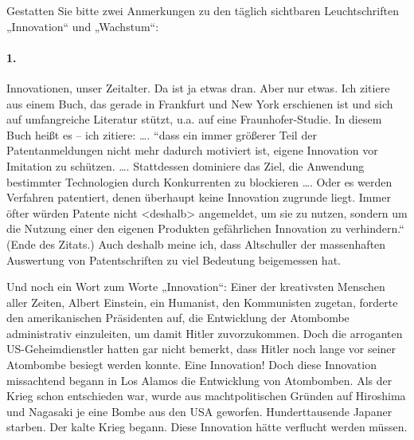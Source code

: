 \documentclass[12pt,a4paper]{article}
\begin{document}
Gestatten Sie bitte zwei Anmerkungen zu den täglich sichtbaren Leuchtschriften „Innovation“ und „Wachstum“:

\paragraph{1.}
Innovationen, unser Zeitalter. Da ist ja etwas dran. Aber nur etwas. Ich
zitiere aus einem Buch, das gerade in Frankfurt und New York erschienen ist und
sich auf umfangreiche Literatur stützt, u.a. auf eine Fraunhofer-Studie. In
diesem Buch heißt es – ich zitiere: …. “dass ein immer größerer Teil der
Patentanmeldungen nicht mehr dadurch motiviert ist, eigene Innovation vor
Imitation zu schützen. …. Stattdessen dominiere das Ziel, die Anwendung
bestimmter Technologien durch Konkurrenten zu blockieren …. Oder es werden
Verfahren patentiert, denen überhaupt keine Innovation zugrunde liegt. Immer
öfter würden Patente nicht <deshalb> angemeldet, um sie zu nutzen, sondern um
die Nutzung einer den eigenen Produkten gefährlichen Innovation zu verhindern.“
(Ende des Zitats.) Auch deshalb meine ich, dass Altschuller der massenhaften
Auswertung von Patentschriften zu viel Bedeutung beigemessen hat.

Und noch ein Wort zum Worte „Innovation“: Einer der kreativsten Menschen aller
Zeiten, Albert Einstein, ein Humanist, den Kommunisten zugetan, forderte den
amerikanischen Präsidenten auf, die Entwicklung der Atombombe administrativ
einzuleiten, um damit Hitler zuvorzukommen. Doch die arroganten
US-Geheimdienstler hatten gar nicht bemerkt, dass Hitler noch lange vor seiner
Atombombe besiegt werden konnte. Eine Innovation! Doch diese Innovation
missachtend begann in Los Alamos die Entwicklung von Atombomben. Als der Krieg
schon entschieden war, wurde aus machtpolitischen Gründen auf Hiroshima und
Nagasaki je eine Bombe aus den USA geworfen. Hunderttausende Japaner
starben. Der kalte Krieg begann. Diese Innovation hätte verflucht werden
müssen.
\end{document}
